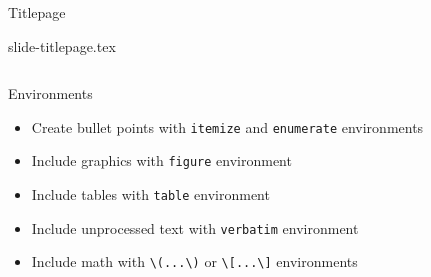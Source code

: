 \documentclass[xcolor=x11names, xcolor=table]{beamer}
\begin{document}
\begin{frame}{Titlepage}
    \begin{block}{slide-titlepage.tex}
        \inputminted{latex}{tex/slide-titlepage.tex}
    \end{block}
\end{frame}


\begin{frame}[fragile]{Environments}
\begin{itemize}
    \item Create bullet points with \texttt{itemize} and \texttt{enumerate}
    environments
    \item Include graphics with \texttt{figure} environment
    \item Include tables with \texttt{table} environment
    \item Include unprocessed text with \texttt{verbatim} environment
    \item Include math with \verb+\(...\)+ or \verb+\[...\]+ environments
\end{itemize}
\end{frame}
\end{document}
